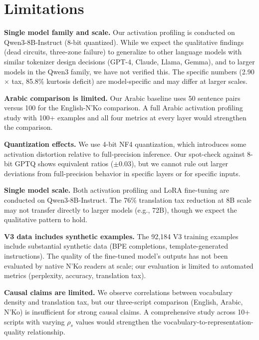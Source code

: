 \documentclass[11pt]{article}
\begin{document}
\section{Limitations}

\textbf{Single model family and scale.}
Our activation profiling is conducted on Qwen3-8B-Instruct (8-bit quantized).
While we expect the qualitative findings (dead circuits, three-zone failure) to generalize to other language models with similar tokenizer design decisions (GPT-4, Claude, Llama, Gemma), and to larger models in the Qwen3 family, we have not verified this.
The specific numbers (2.90$\times$ tax, 85.8\% kurtosis deficit) are model-specific and may differ at larger scales.

\textbf{Arabic comparison is limited.}
Our Arabic baseline uses 50 sentence pairs versus 100 for the English-N'Ko comparison.
A full Arabic activation profiling study with 100+ examples and all four metrics at every layer would strengthen the comparison.

\textbf{Quantization effects.}
We use 4-bit NF4 quantization, which introduces some activation distortion relative to full-precision inference.
Our spot-check against 8-bit GPTQ shows equivalent ratios ($\pm$0.03), but we cannot rule out larger deviations from full-precision behavior in specific layers or for specific inputs.

\textbf{Single model scale.}
Both activation profiling and LoRA fine-tuning are conducted on Qwen3-8B-Instruct.
The 76\% translation tax reduction at 8B scale may not transfer directly to larger models (e.g., 72B), though we expect the qualitative pattern to hold.

\textbf{V3 data includes synthetic examples.}
The 92,184 V3 training examples include substantial synthetic data (BPE completions, template-generated instructions).
The quality of the fine-tuned model's outputs has not been evaluated by native N'Ko readers at scale; our evaluation is limited to automated metrics (perplexity, accuracy, translation tax).

\textbf{Causal claims are limited.}
We observe correlations between vocabulary density and translation tax, but our three-script comparison (English, Arabic, N'Ko) is insufficient for strong causal claims.
A comprehensive study across 10+ scripts with varying $\rho_s$ values would strengthen the vocabulary-to-representation-quality relationship.

\end{document}
